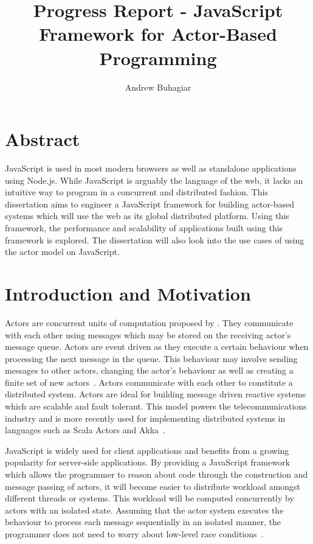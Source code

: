 \documentclass[12pt]{report}
\author{Andrew Buhagiar}
\title{Progress Report - JavaScript Framework for Actor-Based Programming}
\begin{document}
\maketitle
\tableofcontents
\listoffigures
\newpage
\section{Abstract}
JavaScript is used in most modern browsers as well as standalone applications using Node.js. While JavaScript is arguably the language of the web, it lacks an intuitive way to program in a concurrent and distributed fashion. This dissertation aims to engineer a JavaScript framework for building actor-based systems which will use the web as its global distributed platform. Using this framework, the performance and scalability of applications built using this framework is explored. The dissertation will also look into the use cases of using the actor model on JavaScript.
\section{Introduction and Motivation}
Actors\cite{43years} are concurrent units of computation proposed by \cite{hewitt1973session}. They communicate with each other using messages which may be stored on the receiving actor's message queue. Actors are event driven as they execute a certain behaviour when processing the next message in the queue. This behaviour may involve sending messages to other actors, changing the actor's behaviour as well as creating a finite set of new actors~\cite{hewitt2010actor}. Actors communicate with each other to constitute a distributed system. Actors are ideal for building message driven reactive systems~\cite{reactivemanifesto} which are scalable and fault tolerant. This model powers the telecommunications industry and is more recently used for implementing distributed systems in languages such as Scala Actors and Akka~\cite{haller2012integration}.

JavaScript is widely used for client applications and benefits from a growing popularity for server-side applications. By providing a JavaScript framework which allows the programmer to reason about code through the construction and message passing of actors, it will become easier to distribute workload amongst different threads or systems. This workload will be computed concurrently by actors with an isolated state. Assuming that the actor system executes the behaviour to process each message sequentially in an isolated manner, the programmer does not need to worry about low-level race conditions~\cite{43years}\cite{haller2010isolated}. 
\end{document}
